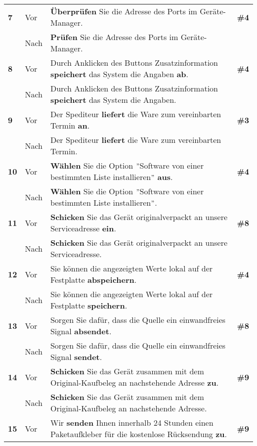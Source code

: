 \begin{longtable}{llp{}l}
\tablevspace
{ \textbf{7}} & Vor & \textbf{Überprüfen} Sie die Adresse des Ports im Geräte-Manager. & \textbf{\#4}\\
& Nach & \textbf{Prüfen} Sie die Adresse des Ports im Geräte-Manager. & \\
\tablevspace
{ \textbf{8}} & Vor & Durch Anklicken des Buttons Zusatzinformation \textbf{speichert} das System die Angaben \textbf{ab}. & \textbf{\#4}\\
& Nach & Durch Anklicken des Buttons Zusatzinformation \textbf{speichert} das System die Angaben. & \\
\tablevspace
{ \textbf{9}} & Vor & Der Spediteur \textbf{liefert} die Ware zum vereinbarten Termin \textbf{an}. & \textbf{\#3}\\
& Nach & Der Spediteur \textbf{liefert} die Ware zum vereinbarten Termin. & \\
\tablevspace
{ \textbf{10}} & Vor & \textbf{Wählen} Sie die Option $"$Software von einer bestimmten Liste installieren$"$ \textbf{aus}. & \textbf{\#4}\\
& Nach & \textbf{Wählen} Sie die Option $"$Software von einer bestimmten Liste installieren$"$. & \\
\tablevspace
{ \textbf{11}} & Vor & \textbf{Schicken} Sie das Gerät originalverpackt an unsere Serviceadresse \textbf{ein}. & \textbf{\#8}\\
& Nach & \textbf{Schicken} Sie das Gerät originalverpackt an unsere Serviceadresse. & \\
\tablevspace
{ \textbf{12}} & Vor & Sie können die angezeigten Werte lokal auf der Festplatte \textbf{abspeichern}. & \textbf{\#4}\\
& Nach & Sie können die angezeigten Werte lokal auf der Festplatte \textbf{speichern}. & \\
\tablevspace
{ \textbf{13}} & Vor & Sorgen Sie dafür, dass die Quelle ein einwandfreies Signal \textbf{absendet}. & \textbf{\#8}\\
& Nach & Sorgen Sie dafür, dass die Quelle ein einwandfreies Signal \textbf{sendet}. & \\
\tablevspace
{ \textbf{14}} & Vor & \textbf{Schicken} Sie das Gerät zusammen mit dem Original-Kaufbeleg an nachstehende Adresse \textbf{zu}. & \textbf{\#9}\\
& Nach & \textbf{Schicken} Sie das Gerät zusammen mit dem Original-Kaufbeleg an nachstehende Adresse. & \\
\tablevspace
{ \textbf{15}} & Vor & Wir \textbf{senden} Ihnen innerhalb 24 Stunden einen Paketaufkleber für die kostenlose Rücksendung \textbf{zu}. & \textbf{\#9}\\

\end{longtable}
